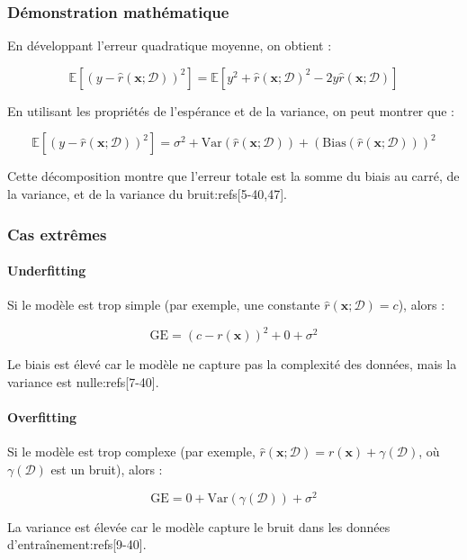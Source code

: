 \documentclass[10pt,a4paper]{article}
\begin{document}
\subsubsection*{Démonstration mathématique}

En développant l'erreur quadratique moyenne, on obtient :

$$
\mathbb{E}\left[(y - \hat{r}(\mathbf{x}; \mathcal{D}))^{2}\right] = \mathbb{E}\left[y^{2} + \hat{r}(\mathbf{x}; \mathcal{D})^{2} - 2y\hat{r}(\mathbf{x}; \mathcal{D})\right]
$$

En utilisant les propriétés de l'espérance et de la variance, on peut montrer que :

$$
\mathbb{E}\left[(y - \hat{r}(\mathbf{x}; \mathcal{D}))^{2}\right] = \sigma^{2} + \text{Var}(\hat{r}(\mathbf{x}; \mathcal{D})) + (\text{Bias}(\hat{r}(\mathbf{x}; \mathcal{D})))^{2}
$$

Cette décomposition montre que l'erreur totale est la somme du biais au carré, de la variance, et de la variance du bruit:refs[5-40,47].

\subsubsection*{Cas extrêmes}

\paragraph{Underfitting}

Si le modèle est trop simple (par exemple, une constante $\hat{r}(\mathbf{x}; \mathcal{D}) = c$), alors :

$$
\text{GE} = (c - r(\mathbf{x}))^2 + 0 + \sigma^2
$$

Le biais est élevé car le modèle ne capture pas la complexité des données, mais la variance est nulle:refs[7-40].

\paragraph{Overfitting}

Si le modèle est trop complexe (par exemple, $\hat{r}(\mathbf{x}; \mathcal{D}) = r(\mathbf{x}) + \gamma(\mathcal{D})$, où $\gamma(\mathcal{D})$ est un bruit), alors :

$$
\text{GE} = 0 + \text{Var}(\gamma(\mathcal{D})) + \sigma^2
$$

La variance est élevée car le modèle capture le bruit dans les données d'entraînement:refs[9-40].
\end{document}
